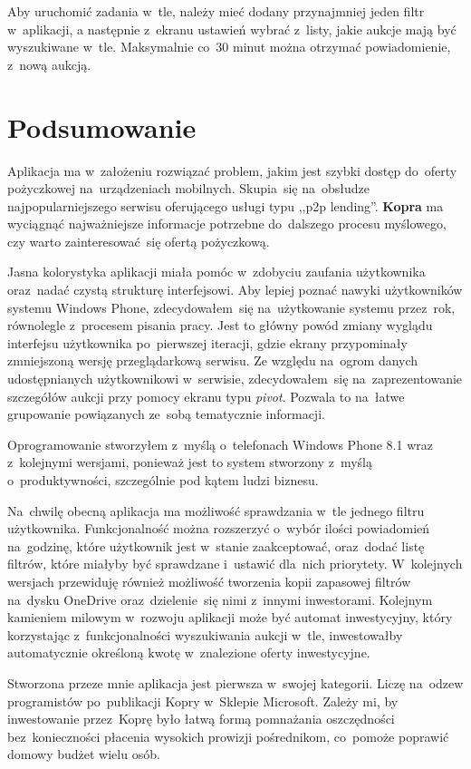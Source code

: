 \documentclass[a4paper,twoside,titlepage,openright]{book}
\begin{document}
Aby uruchomić zadania w~tle, należy mieć dodany przynajmniej jeden filtr w~aplikacji, a następnie z~ekranu ustawień wybrać z~listy, jakie aukcje mają być wyszukiwane w~tle. Maksymalnie co~30 minut można otrzymać powiadomienie, z~nową aukcją.


\chapter{Podsumowanie}
Aplikacja ma w~założeniu rozwiązać problem, jakim jest szybki dostęp do~oferty pożyczkowej na~urządzeniach mobilnych. Skupia~się na~obsłudze najpopularniejszego serwisu oferującego usługi typu ,,p2p lending''. \textbf{Kopra} ma wyciągnąć najważniejsze informacje potrzebne do~dalszego procesu myślowego, czy warto zainteresować~się ofertą pożyczkową. 

Jasna kolorystyka aplikacji miała pomóc w~zdobyciu zaufania użytkownika oraz~nadać czystą strukturę interfejsowi. Aby lepiej poznać nawyki użytkowników systemu Windows Phone, zdecydowałem~się na~użytkowanie systemu przez~rok, równolegle z~procesem pisania pracy. Jest to główny powód zmiany wyglądu interfejsu użytkownika po~pierwszej iteracji, gdzie ekrany przypominały zmniejszoną wersję przeglądarkową serwisu. Ze względu na~ogrom danych udostępnianych użytkownikowi w~serwisie, zdecydowałem~się na~zaprezentowanie szczegółów aukcji przy pomocy ekranu typu \textit{pivot}. Pozwala to na~łatwe grupowanie powiązanych ze~sobą tematycznie informacji. 

Oprogramowanie stworzyłem z~myślą o~telefonach Windows Phone 8.1 wraz z~kolejnymi wersjami, ponieważ jest to system stworzony z~myślą o~produktywności, szczególnie pod kątem ludzi biznesu.

Na~chwilę obecną aplikacja ma możliwość sprawdzania w~tle jednego filtru użytkownika. Funkcjonalność można rozszerzyć o~wybór ilości powiadomień na~godzinę, które użytkownik jest w~stanie zaakceptować, oraz~dodać listę filtrów, które miałyby być sprawdzane i~ustawić dla~nich priorytety. W~kolejnych wersjach przewiduję również możliwość tworzenia kopii zapasowej filtrów na~dysku OneDrive oraz~dzielenie~się nimi z~innymi inwestorami. Kolejnym kamieniem milowym w~rozwoju aplikacji może być automat inwestycyjny, który korzystając z~funkcjonalności wyszukiwania aukcji w~tle, inwestowałby automatycznie określoną kwotę w~znalezione oferty inwestycyjne.

Stworzona przeze mnie aplikacja jest pierwsza w~swojej kategorii. Liczę na~odzew programistów po~publikacji Kopry w~Sklepie Microsoft. Zależy mi, by inwestowanie przez~Koprę było łatwą formą pomnażania oszczędności bez~konieczności płacenia wysokich prowizji pośrednikom, co~pomoże poprawić domowy budżet wielu osób.
\end{document}
